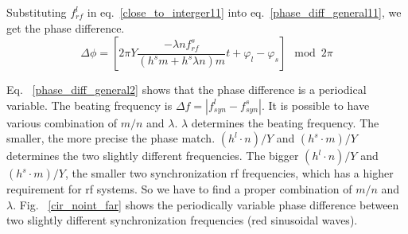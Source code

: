 Substituting $f_{\mathit{rf}}^{l}$ in eq.~\ref{close_to_interger11} into eq.~\ref{phase_diff_general11}, we get the phase difference.
\begin{equation}
	\Delta \phi=[2\pi Y\frac{-\lambda n f_{\mathit{rf}}^{s}}{(h^{s}m+h^{s}\lambda n)m}t+\varphi_l-\varphi_s] \mod 2\pi \label{phase_diff_general23}
\end{equation}

Eq. ~\ref{phase_diff_general2} shows that the phase difference is a periodical variable. The beating frequency is $\Delta f=|f_{\mathit{syn}}^{l}-f_{\mathit{syn}}^{s}|$. It is possible to have various combination of $m/n$ and $\lambda$. $\lambda$ determines the beating frequency. The smaller, the more precise the phase match. $(h^l\cdot n)/Y$ and $(h^s\cdot m)/Y$ determines the two slightly different frequencies. The bigger $(h^l\cdot n)/Y$ and $(h^s\cdot m)/Y$, the smaller two synchronization rf frequencies, which has a higher requirement for rf systems. So we have to find a proper combination of $m/n$ and $\lambda$. Fig. ~\ref{cir_noint_far} shows the periodically variable phase difference between two slightly different synchronization frequencies (red sinusoidal waves).



